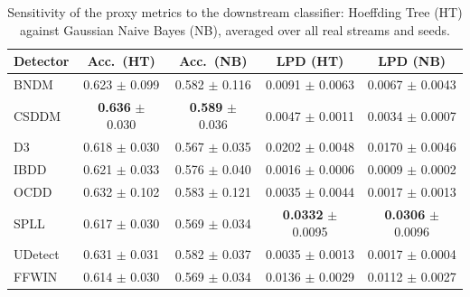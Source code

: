 \begin{table}[!t]
\centering
\caption{Sensitivity of the proxy metrics to the downstream classifier: Hoeffding Tree (HT) against Gaussian Naive Bayes (NB), averaged over all real streams and seeds.}
\label{tab:classifier_sensitivity}
\footnotesize
\setlength{\tabcolsep}{5pt}
\begin{tabular}{@{}lcccc@{}}
\toprule
\textbf{Detector} & \textbf{Acc.\ (HT)} & \textbf{Acc.\ (NB)} & \textbf{LPD (HT)} & \textbf{LPD (NB)} \\
\midrule
BNDM & 0.623 $\pm$ 0.099 & 0.582 $\pm$ 0.116 & 0.0091 $\pm$ 0.0063 & 0.0067 $\pm$ 0.0043 \\
CSDDM & \textbf{0.636} $\pm$ 0.030 & \textbf{0.589} $\pm$ 0.036 & 0.0047 $\pm$ 0.0011 & 0.0034 $\pm$ 0.0007 \\
D3 & 0.618 $\pm$ 0.030 & 0.567 $\pm$ 0.035 & 0.0202 $\pm$ 0.0048 & 0.0170 $\pm$ 0.0046 \\
IBDD & 0.621 $\pm$ 0.033 & 0.576 $\pm$ 0.040 & 0.0016 $\pm$ 0.0006 & 0.0009 $\pm$ 0.0002 \\
OCDD & 0.632 $\pm$ 0.102 & 0.583 $\pm$ 0.121 & 0.0035 $\pm$ 0.0044 & 0.0017 $\pm$ 0.0013 \\
SPLL & 0.617 $\pm$ 0.030 & 0.569 $\pm$ 0.034 & \textbf{0.0332} $\pm$ 0.0095 & \textbf{0.0306} $\pm$ 0.0096 \\
UDetect & 0.631 $\pm$ 0.031 & 0.582 $\pm$ 0.037 & 0.0035 $\pm$ 0.0013 & 0.0017 $\pm$ 0.0004 \\
FFWIN & 0.614 $\pm$ 0.030 & 0.569 $\pm$ 0.034 & 0.0136 $\pm$ 0.0029 & 0.0112 $\pm$ 0.0027 \\
\bottomrule
\end{tabular}
\end{table}
